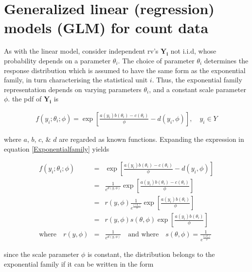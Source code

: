 \documentclass{DissertateUSU}
\begin{document}
\section{Generalized linear (regression) models (GLM) for count data}
\label{sec4:Generalized linear (regression) models (GLM) for count data}

As with the linear model, consider independent rv's \(\mathbf{Y_i}\) not
i.i.d, whose probability depends on a parameter \(\theta_i\). The choice
of parameter \(\theta_i\) determines the response distribution which is
assumed to have the same form as the exponential family, in turn
characterising the statistical unit \(i\). Thus, the exponential family
representation depends on varying parameters \(\theta_i\), and a
constant scale parameter \(\phi\). the pdf of \(\mathbf{Y_i}\) is

\singlespacing

\begin{eqnarray}\label{Exponentialfamily}
f(y_i;\theta_i;\phi) = \exp\left[\frac{a(y_i)b(\theta_i) -c(\theta_i)}{\phi}-d(y_i,\phi)\right], \quad y_i \in Y 
\end{eqnarray} \doublespacing

where \(a\), \(b\), \(c\), \& \(d\) are regarded as known functions.
Expanding the expression in equation \ref{Exponentialfamily} yields

\singlespacing

\begin{eqnarray}\label{Exponentialfamilies}
f(y_i;\theta_i;\phi) &=& \exp\left[\frac{a(y_i)b(\theta_i) -c(\theta_i)}{\phi}-d(y_i,\phi)\right] \nonumber\\
 &=& \frac{1}{e^{d(y,\phi)}}\exp\left[\frac{a(y_i)b(\theta_i) -c(\theta_i)}{\phi}\right] \nonumber\\
 &=& r(y,\phi)\frac{1}{e^{\frac{c(\theta_i)}{\phi}}}\exp\left[\frac{a(y_i)b(\theta_i)}{\phi}\right] \nonumber\\
 &=& r(y,\phi)s(\theta,\phi)\exp\left[\frac{a(y_i)b(\theta_i)}{\phi}\right]\\
 \mbox{where} \quad r(y,\phi) &=& \frac{1}{e^{d(y,\phi)}}\quad \mbox{and where}\quad s(\theta,\phi) = \frac{1}{e^{\frac{c(\theta_i)}{\phi}}}\nonumber
\end{eqnarray} \doublespacing

since the scale parameter \(\phi\) is constant, the distribution belongs
to the exponential family if it can be written in the form

\singlespacing
\end{document}
